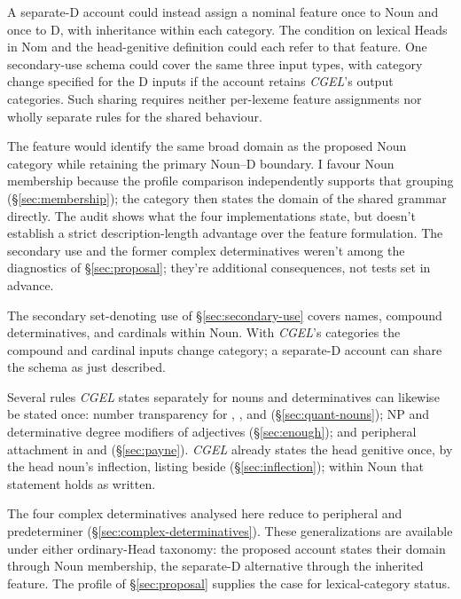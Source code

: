 \documentclass[12pt]{article}
\begin{document}
A separate-D account could instead assign a nominal feature once to Noun and once to D, with inheritance within each category. The condition on lexical Heads in Nom and the head-genitive definition could each refer to that feature. One secondary-use schema could cover the same three input types, with category change specified for the D inputs if the account retains \textit{CGEL}'s output categories. Such sharing requires neither per-lexeme feature assignments nor wholly separate rules for the shared behaviour.

The feature would identify the same broad domain as the proposed Noun category while retaining the primary Noun--D boundary. I favour Noun membership because the profile comparison independently supports that grouping (§\ref{sec:membership}); the category then states the domain of the shared grammar directly. The audit shows what the four implementations state, but doesn't establish a strict description-length advantage over the feature formulation. The secondary use and the former complex determinatives weren't among the diagnostics of §\ref{sec:proposal}; they're additional consequences, not tests set in advance.

The secondary set-denoting use of §\ref{sec:secondary-use} covers names, compound determinatives, and cardinals within Noun. With \textit{CGEL}'s categories the compound and cardinal inputs change category; a separate-D account can share the schema as just described.

Several rules \textit{CGEL} states separately for nouns and determinatives can likewise be stated once: number transparency for , , and  (§\ref{sec:quant-nouns}); NP and determinative degree modifiers of adjectives (§\ref{sec:enough}); and peripheral attachment in  and  (§\ref{sec:payne}). \textit{CGEL} already states the head genitive once, by the head noun's inflection, listing  beside  (§\ref{sec:inflection}); within Noun that statement holds as written.

The four complex determinatives analysed here reduce to peripheral  and predeterminer  (§\ref{sec:complex-determinatives}). These generalizations are available under either ordinary-Head taxonomy: the proposed account states their domain through Noun membership, the separate-D alternative through the inherited feature. The profile of §\ref{sec:proposal} supplies the case for lexical-category status.
\end{document}
